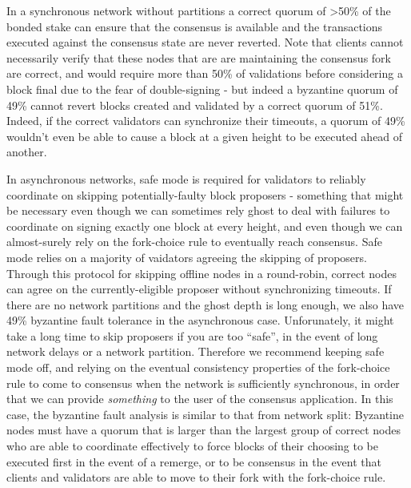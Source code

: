 \documentclass[11pt,a4paper]{article}
\begin{document}
In a synchronous network without partitions a correct quorum of >50\% of the bonded stake can ensure that the consensus is available and the transactions executed against the consensus state are never reverted. Note that clients cannot necessarily verify that these nodes that are are maintaining the consensus fork are correct, and would require more than 50\% of validations before considering a block final due to the fear of double-signing - but indeed a byzantine quorum of 49\% cannot revert blocks created and validated by a correct quorum of 51\%. Indeed, if the correct validators can synchronize their timeouts, a quorum of 49\% wouldn't even be able to cause a block at a given height to be executed ahead of another.

In asynchronous networks, safe mode is required for validators to reliably coordinate on skipping potentially-faulty block proposers - something that might be necessary even though we can sometimes rely ghost to deal with failures to coordinate on signing exactly one block at every height, and even though we can almost-surely rely on the fork-choice rule to eventually reach consensus. Safe mode relies on a majority of vaidators agreeing the skipping of proposers. Through this protocol for skipping offline nodes in a round-robin, correct nodes can agree on the currently-eligible proposer without synchronizing timeouts. If there are no network partitions and the ghost depth is long enough, we also have 49\% byzantine fault tolerance in the asynchronous case.  Unforunately, it might take a long time to skip proposers if you are too ``safe'', in the event of long network delays or a network partition. Therefore we recommend keeping safe mode off, and relying on the eventual consistency properties of the fork-choice rule to come to consensus when the network is sufficiently synchronous, in order that we can provide \emph{something} to the user of the consensus application. In this case, the byzantine fault analysis is similar to that from network split: Byzantine nodes must have a quorum that is larger than the largest group of correct nodes who are able to coordinate effectively to force blocks of their choosing to be executed first in the event of a remerge, or to be consensus in the event that clients and validators are able to move to their fork with the fork-choice rule.
\end{document}
